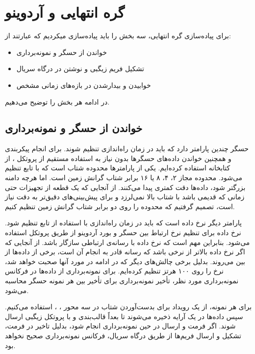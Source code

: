 \section{گره انتهایی و آردوینو}

برای پیاده‌سازی گره انتهایی، سه بخش را باید پیاده‌سازی میکردیم که عبارتند از:

\begin{itemize}
\item خواندن از حسگر و نمونه‌برداری
\item تشکیل فریم زیگبی و نوشتن در درگاه سریال
\item خوابیدن و بیدارشدن در بازه‌های زمانی مشخص
\end{itemize}

در ادامه هر بخش را توضیح می‌دهیم.

\subsection{خواندن از حسگر و نمونه‌برداری}

حسگر  چندین پارامتر دارد که باید در زمان راه‌اندازی تنظیم شوند. برای انجام پیکربندی و همچنین خواندن داده‌های حسگرها بدون نیاز به استفاده مستقیم از پروتکل ، از کتابخانه استفاده کرده‌ایم. یکی از پارامترها محدوده شتاب است که با تابع  تنظیم می‌شود. محدوده مجاز ۲، ۴، ۸ یا ۱۶ برابر شتاب گرانش زمین است. اما هرچه دامنه بزرگتر شود، داده‌ها دقت کمتری پیدا می‌کنند. از آنجایی که یک قطعه از تجهیزات حتی زمانی که قدیمی باشد با شتاب بالا نمی‌لرزد و برای پیش‌بینی‌های دقیق‌تر به دقت نیاز است، تصمیم گرفتیم که محدوده را روی دو برابر شتاب گرانش زمین تنظیم کنیم.


پارامتر دیگر نرخ داده است که باید در زمان راه‌اندازی با استفاده از تابع  تنظیم شود. نرخ داده برای تنظیم نرخ ارتباط بین حسگر و بورد آردوینو از طریق پروتکل  استفاده می‌شود. بنابراین مهم است که نرخ داده با رسانه‌ی ارتباطی سازگار باشد. از آنجایی که اگر نرخ داده بالاتر از نرخی باشد که رسانه قادر به انجام آن است، برخی از داده‌ها از بین می‌روند. بدلیل برخی چالش‌های دیگر که در ادامه در مورد آنها صحبت خواهد شد، نرخ را روی ۱۰۰ هرتز تنظیم کرده‌ایم. برای نمونه‌برداری از داده‌ها در فرکانس نمونه‌برداری مورد نظر، تأخیر نمونه‌برداری برای تأخیر بین هر نمونه حسگر محاسبه می‌شود.

برای هر نمونه، از یک رویداد برای بدست‌آوردن شتاب در سه محور ، ،  استفاده می‌کنیم. سپس داده‌ها در یک آرایه ذخیره می‌شوند تا بعداً قالب‌بندی و با پروتکل زیگبی ارسال شوند. اگر فرمت و ارسال در حین نمونه‌برداری انجام شود، بدلیل تاخیر در فرمت، تشکیل و ارسال فریم‌ها از طریق درگاه سریال، فرکانس نمونه‌برداری صحیح نخواهد بود.

